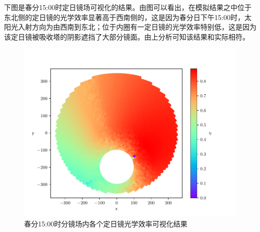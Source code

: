 下图是春分15:00时定日镜场可视化的结果。由图可以看出，在模拟结果之中位于东北侧的定日镜的光学效率显著高于西南侧的，这是因为春分日下午15:00时，太阳光入射方向为由西南到东北；位于内圈有一定日镜的光学效率特别低，这是因为该定日镜被吸收塔的阴影遮挡了大部分镜面。由上分析可知该结果和实际相符。
%
\begin{figure}[H]
\centering
\includegraphics[scale = 0.7]{rainbow2.pdf}
\caption{\kaishu 春分{\rm 15:00}时分镜场内各个定日镜光学效率可视化结果}\label{rainbow2}
\end{figure}
